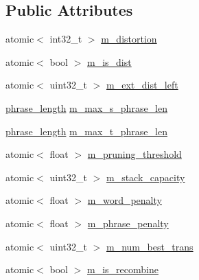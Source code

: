 \subsection*{Public Attributes}
\begin{DoxyCompactItemize}
\item 
atomic$<$ int32\+\_\+t $>$ \hyperlink{structuva_1_1smt_1_1bpbd_1_1server_1_1decoder_1_1de__parameters__struct_aa9ec1effb0a31c054b3751ccb2635642}{m\+\_\+distortion}
\item 
atomic$<$ bool $>$ \hyperlink{structuva_1_1smt_1_1bpbd_1_1server_1_1decoder_1_1de__parameters__struct_a3f31a773006e9cd2a83111f5af5d2140}{m\+\_\+is\+\_\+dist}
\item 
atomic$<$ uint32\+\_\+t $>$ \hyperlink{structuva_1_1smt_1_1bpbd_1_1server_1_1decoder_1_1de__parameters__struct_af649e192d112d6ef69ef60a5606b7211}{m\+\_\+ext\+\_\+dist\+\_\+left}
\item 
\hyperlink{namespaceuva_1_1smt_1_1bpbd_1_1server_af068a19c2e03116caf3e3827a3e40e35}{phrase\+\_\+length} \hyperlink{structuva_1_1smt_1_1bpbd_1_1server_1_1decoder_1_1de__parameters__struct_a1536b5a070034c8001cb65d25cf7ea2d}{m\+\_\+max\+\_\+s\+\_\+phrase\+\_\+len}
\item 
\hyperlink{namespaceuva_1_1smt_1_1bpbd_1_1server_af068a19c2e03116caf3e3827a3e40e35}{phrase\+\_\+length} \hyperlink{structuva_1_1smt_1_1bpbd_1_1server_1_1decoder_1_1de__parameters__struct_a08635a97c1267f0b5c0e50044728a31f}{m\+\_\+max\+\_\+t\+\_\+phrase\+\_\+len}
\item 
atomic$<$ float $>$ \hyperlink{structuva_1_1smt_1_1bpbd_1_1server_1_1decoder_1_1de__parameters__struct_a2c3855b93f609a66582fd160c5ec66ce}{m\+\_\+pruning\+\_\+threshold}
\item 
atomic$<$ uint32\+\_\+t $>$ \hyperlink{structuva_1_1smt_1_1bpbd_1_1server_1_1decoder_1_1de__parameters__struct_aafc1848296f729af40d1331660e17303}{m\+\_\+stack\+\_\+capacity}
\item 
atomic$<$ float $>$ \hyperlink{structuva_1_1smt_1_1bpbd_1_1server_1_1decoder_1_1de__parameters__struct_a64e98803ca81cbf1ce6ea815f7efa6a0}{m\+\_\+word\+\_\+penalty}
\item 
atomic$<$ float $>$ \hyperlink{structuva_1_1smt_1_1bpbd_1_1server_1_1decoder_1_1de__parameters__struct_ac478cd324467eba844b08e20cbe08d34}{m\+\_\+phrase\+\_\+penalty}
\item 
atomic$<$ uint32\+\_\+t $>$ \hyperlink{structuva_1_1smt_1_1bpbd_1_1server_1_1decoder_1_1de__parameters__struct_ae4c10b88dd8010dc8db2fe9b443b8826}{m\+\_\+num\+\_\+best\+\_\+trans}
\item 
atomic$<$ bool $>$ \hyperlink{structuva_1_1smt_1_1bpbd_1_1server_1_1decoder_1_1de__parameters__struct_ac9cec14fcb7a1c8a8a7caf47826b8457}{m\+\_\+is\+\_\+recombine}
\end{DoxyCompactItemize}


